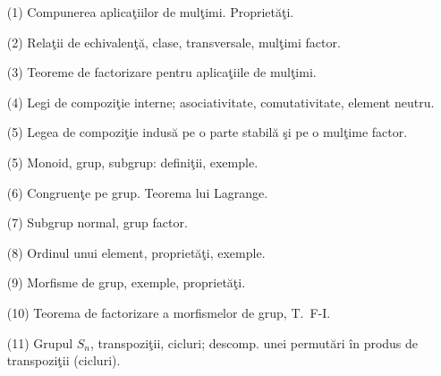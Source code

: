 \begin{enumerate}
\item[(1)] Compunerea aplica\c{t}iilor de mul\c{t}imi. Propriet\u{a}\c{t}i.
\item[(2)] Rela\c{t}ii de echivalen\c{t}\u{a}, clase, transversale, mul\c{t}imi factor.
\item[(3)] Teoreme de factorizare pentru aplica\c{t}iile de mul\c{t}imi.
\item[(4)] Legi de compozi\c{t}ie interne; asociativitate, comutativitate, element neutru.
\item[(5)] Legea de compozi\c{t}ie indus\u{a} pe o parte stabil\u{a} \c{s}i pe o mul\c{t}ime factor.
\item[(5)] Monoid, grup, subgrup: defini\c{t}ii, exemple.
\item[(6)] Congruen\c{t}e pe grup. Teorema lui Lagrange.
\item[(7)] Subgrup normal, grup factor.
\item[(8)] Ordinul unui element, propriet\u{a}\c{t}i, exemple.
\item[(9)] Morfisme de grup, exemple, propriet\u{a}\c{t}i.
\item[(10)] Teorema de factorizare a morfismelor de grup, T.~F-I.
\item[(11)] Grupul $S_n$, transpozi\c{t}ii, cicluri; descomp. unei permut\u{a}ri
\^{i}n produs de transpozi\c{t}ii (cicluri).
\end{enumerate}
